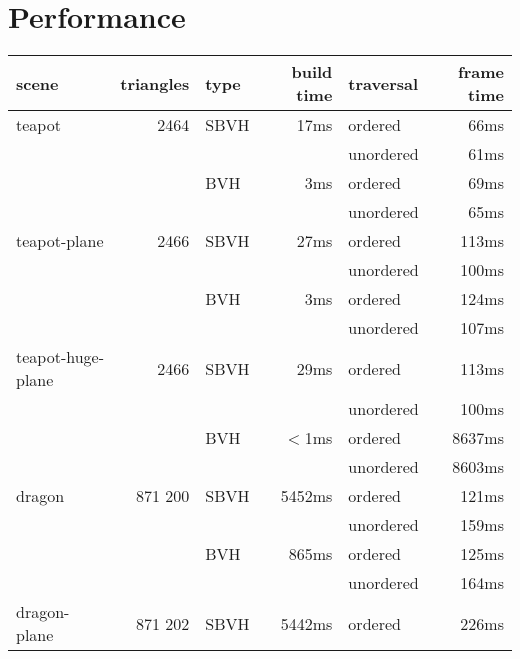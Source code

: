\section{Performance}

\begin{tabular}{lrlrlr}
    \toprule
    \textbf{scene} & \textbf{triangles} & \textbf{type} & \textbf{build time} & \textbf{traversal} & \textbf{frame time} \\
    \midrule
    teapot         &      2464 & SBVH &     17ms & ordered   &    66ms \\
                   &           &      &          & unordered &    61ms \\
                   &           & BVH  &      3ms & ordered   &    69ms \\
                   &           &      &          & unordered &    65ms \\
    \midrule                                     
    teapot-plane   &      2466 & SBVH &     27ms & ordered   &   113ms \\
                   &           &      &          & unordered &   100ms \\
                   &           & BVH  &      3ms & ordered   &   124ms \\
                   &           &      &          & unordered &   107ms \\
    \midrule                                     
    teapot-huge-plane &   2466 & SBVH &     29ms & ordered   &   113ms \\
                   &           &      &          & unordered &   100ms \\
                   &           & BVH  &   $<$1ms & ordered   &  8637ms \\
                   &           &      &          & unordered &  8603ms \\
    \midrule                                     
    dragon         &   871 200 & SBVH &   5452ms & ordered   &   121ms \\
                   &           &      &          & unordered &   159ms \\
                   &           & BVH  &    865ms & ordered   &   125ms \\
                   &           &      &          & unordered &   164ms \\
    \midrule                                     
    dragon-plane   &   871 202 & SBVH &   5442ms & ordered   &   226ms \\

\end{tabular}
